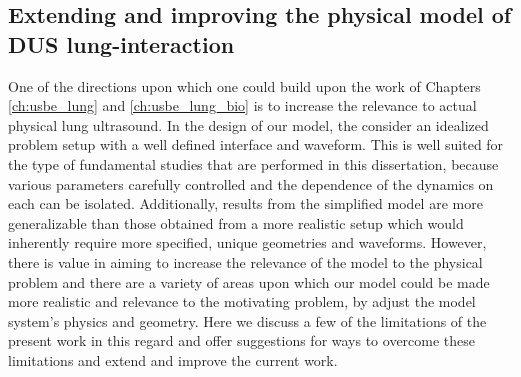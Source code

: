 \subsection{Extending and improving the physical model of \ac{DUS} lung-interaction}
One of the directions upon which one could build upon the work of
Chapters \ref{ch:usbe_lung} and \ref{ch:usbe_lung_bio} is to increase
the relevance to actual physical lung ultrasound. In the design of our
model, the consider an idealized problem setup with a well defined
interface and waveform. This is well suited for the type of
fundamental studies that are performed in this dissertation, because
various parameters carefully controlled and the dependence of the
dynamics on each can be isolated. Additionally, results from the
simplified model are more generalizable than those obtained from a
more realistic setup which would inherently require more specified,
unique geometries and waveforms. However, there is value in aiming to
increase the relevance of the model to the physical problem and there
are a variety of areas upon which our model could be made more
realistic and relevance to the motivating problem, by adjust the model
system's physics and geometry. Here we discuss a few of the
limitations of the present work in this regard and offer suggestions
for ways to overcome these limitations and extend and improve the
current work.
